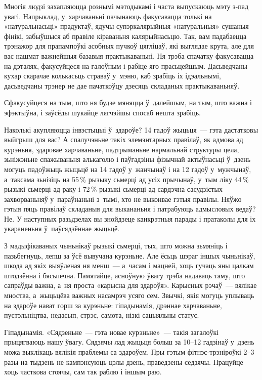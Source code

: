 Многія людзі захапляюцца рознымі мэтодыкамі і часта выпускаюць мэту з-пад увагі. Напрыклад, у~харчаваньні пачынаюць факусавацца толькі на «натуральнасьці» прадуктаў, ядучы супэркалярыйныя «натуральныя» сушаныя фінікі, забыўшыся аб правіле кіраваньня калярыйнасьцю. Так, вам падабаецца трэнажор для прапампоўкі асобных пучкоў цягліцаў, які выглядае крута, але для вас нашмат важнейшыя базавыя практыкаваньні. Ня трэба спачатку факусавацца на дэталях, факусуйцеся на галоўным і рабіце яго прасьцейшым. Дасьведчаны кухар скарачае колькасьць страваў у~мэню, каб зрабіць іх ідэальнымі, дасьведчаны трэнер не дае пачаткоўцу дзесяць складаных практыкаваньняў.

Сфакусуйцеся на тым, што ня будзе мяняцца ў~далейшым, на тым, што важна і эфэктыўна, і заўсёды шукайце лягчэйшы спосаб нешта зрабіць.

Наколькі акупляюцца інвэстыцыі ў~здароўе? 14 гадоў жыцьця~--- гэта дастатковы выйгрыш для вас? А спалучэньне такіх элемэнтарных правілаў, як адмова ад курэньня, здаровае харчаваньне, падтрыманьне нармальнай структуры цела, зьніжэньне спажываньня алькаголю і паўгадзіны фізычнай актыўнасьці ў~дзень могуць падоўжыць жыцьцё на 14 гадоў у~жанчынаў і на 12 гадоў у~мужчынаў, а~таксама зьнізіць на 55\,\% рызыку сьмерці ад усіх прычынаў, у~тым ліку 44\,\% рызыкі сьмерці ад раку і 72\,\% рызыкі сьмерці ад сардэчна-сасудзістых захворваньняў у~параўнаньні з~тымі, хто не выконвае гэтыя правілы. Няўжо гэтыя пяць правілаў складаныя для выкананьня і патрабуюць адмысловых ведаў? Не. У наступных разьдзелах вы знойдзеце канкрэтныя парады і пратаколы для іх укараненьня ў~паўсядзённае жыцьцё.

З мадыфікаваных чыньнікаў рызыкі сьмерці, тых, што можна зьмяніць і пазьбегнуць, лепш за ўсё вывучана курэньне. Але ёсьць шэраг іншых чыньнікаў, шкода ад якіх выяўленая ня менш~--- а~часам і мацней, хоць гучаць яны цалкам штодзённа і бясьпечна. Памятайце, асноўную ўвагу трэба надаваць таму, што сапраўды важна, а~ня проста «карысна для здароўя». Карысных рэчаў~--- вялікае мноства, а~жыцьцёва важных насамрэч усяго сем. Звычкі, якія могуць уплываць на здароўе нават горш за курэньне: гіпадынамія, дрэннае харчаваньне, пустэльніцтва, недасып, стрэс, самота, нізкі сацыяльны статус.

Гіпадынамія. «Сядзеньне~--- гэта новае курэньне»~--- такія загалоўкі прыцягваюць нашу ўвагу. Сядзячы лад жыцьця больш за 10--12 гадзінаў у~дзень можа выклікаць вялікія праблемы са здароўем. Пры гэтым фітнэс-трэніроўкі 2--3 разы на тыдзень не кампэнсуюць цэлы дзень, праведзены седзячы. Працуйце хоць часткова стоячы, сам так раблю і іншым раю.

